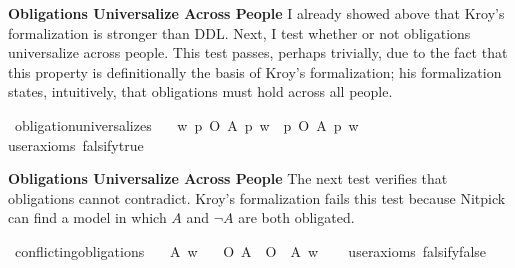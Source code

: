 \begin{isabellebody}
\begin{isamarkuptext}
\noindent \textbf{Obligations Universalize Across People}
I already showed above that Kroy's formalization is stronger than DDL. Next, I test whether or
not obligations universalize across people. This test passes, perhaps trivially, due to the fact that 
this property is definitionally the basis of Kroy's formalization; his formalization states, intuitively, 
that obligations must hold across all people.%
\end{isamarkuptext}\isamarkuptrue%
\isamarkupfalse%
\ obligation{\isacharunderscore}universalizes{\isacharcolon}\isanewline
\ \ \ {\isachardoublequoteopen}{\isasymforall}w{\isachardot}\ {\isacharparenleft}{\isasymexists}p{\isachardot}\ O\ {\isacharbraceleft}A\ p{\isacharbraceright}\ w{\isacharparenright}\ {\isasymlongrightarrow}\ {\isacharparenleft}{\isasymforall}p{\isachardot}\ O\ {\isacharbraceleft}A\ p{\isacharbraceright}\ w{\isacharparenright}{\isachardoublequoteclose}\isanewline
\ \ \isamarkupfalse%
{\isacharbrackleft}user{\isacharunderscore}axioms{\isacharcomma}\ falsify{\isacharequal}true{\isacharbrackright}%
\isadelimproof
\ %
\endisadelimproof
%
\isatagproof
{}\isamarkupfalse%
%
\endisatagproof
{\isafoldproof}%
%
\isadelimproof
%
\endisadelimproof
%
\begin{isamarkuptext}%
\noindent \textbf{Obligations Universalize Across People} The next test verifies that obligations 
cannot contradict. Kroy's formalization fails this test
because Nitpick can find a model in which $A$ and $\neg A$ are both obligated.%
\end{isamarkuptext}\isamarkuptrue%
\isamarkupfalse%
\ conflicting{\isacharunderscore}obligations{\isacharcolon}\isanewline
\ \ \ A\ w\isanewline
\ \ \ {\isachardoublequoteopen}{\isacharparenleft}O\ {\isacharbraceleft}A{\isacharbraceright}\ \isactrlbold {\isasymand}\ O\ {\isacharbraceleft}\isactrlbold {\isasymnot}\ A{\isacharbraceright}{\isacharparenright}\ w{\isachardoublequoteclose}\isanewline
\ \ \isamarkupfalse%
\ {\isacharbrackleft}user{\isacharunderscore}axioms{\isacharcomma}\ falsify{\isacharequal}false{\isacharbrackright}%
\isadelimproof
\ %
\endisadelimproof
%
\isatagproof
{}\isamarkupfalse%
\isanewline
%
\end{isabellebody}
